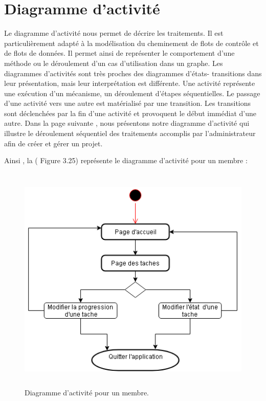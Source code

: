 \newpage

\section{Diagramme d'activit\'{e}}
Le diagramme d'activit\'{e} nous permet de d\'{e}crire les traitements. Il est
particuli\`{e}rement adapt\'{e} \`{a} la mod\'{e}lisation du cheminement de flots de
contr\^{o}le et de flots de donn\'{e}es. Il permet ainsi de repr\'{e}senter le
comportement d'une m\'{e}thode ou le d\'{e}roulement d'un cas d'utilisation dans
un graphe.
Les diagrammes d'activit\'{e}s sont tr\`{e}s proches des diagrammes d'\'{e}tats-
transitions dans leur pr\'{e}sentation, mais leur interpr\'{e}tation est diff\'{e}rente.
Une activit\'{e} repr\'{e}sente une ex\'{e}cution d'un m\'{e}canisme, un d\'{e}roulement
d'\'{e}tapes s\'{e}quentielles. Le passage d'une activit\'{e} vers une autre est mat\'{e}rialis\'{e}
par une transition.
Les transitions sont d\'{e}clench\'{e}es par la fin d'une activit\'{e} et provoquent le
d\'{e}but imm\'{e}diat d'une autre.
Dans la page suivante , nous pr\'{e}sentons notre diagramme d'activit\'{e} qui illustre le
d\'{e}roulement s\'{e}quentiel des traitements accomplis par l'administrateur afin de
cr\'{e}er et g\'{e}rer un projet.



Ainsi , la ( Figure 3.25)  représente le diagramme d'activit\'{e} pour un membre :
\begin{figure}[H]
\center
\includegraphics[width=13cm,height=11cm]{./figures/activity_m.png}
\caption{Diagramme d'activit\'{e} pour un membre.}

\end{figure}




